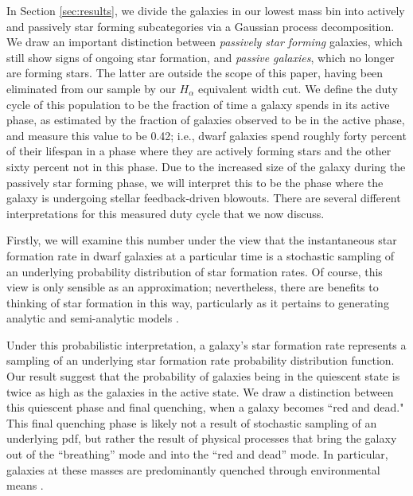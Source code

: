 \documentclass[iop]{emulateapj}
\begin{document}
In Section \ref{sec:results}, we divide the galaxies in our lowest mass bin into actively and passively star forming subcategories via a Gaussian process decomposition. We draw an important distinction between \textit{passively star forming} galaxies, which still show signs of ongoing star formation, and \textit{passive galaxies}, which no longer are forming stars. The latter are outside the scope of this paper, having been eliminated from our sample by our $H_{\alpha}$ equivalent width cut. We define the duty cycle of this population to be the fraction of time a galaxy spends in its active phase, as estimated by the fraction of galaxies observed to be in the active phase, and measure this value to be 0.42; i.e., dwarf galaxies spend roughly forty percent of their lifespan in a phase where they are actively forming stars and the other sixty percent not in this phase. Due to the increased size of the galaxy during the passively star forming phase, we will interpret this to be the phase where the galaxy is undergoing stellar feedback-driven blowouts. There are several different interpretations for this measured duty cycle that we now discuss.

Firstly, we will examine this number under the view that the instantaneous star formation rate in dwarf galaxies at a particular time is a stochastic sampling of an underlying probability distribution of star formation rates. Of course, this view is only sensible as an approximation; nevertheless, there are benefits to thinking of star formation in this way, particularly as it pertains to generating analytic and semi-analytic models \citep{Kelson16}. 

Under this probabilistic interpretation, a galaxy's star formation rate represents a sampling of an underlying star formation rate probability distribution function. Our result suggest that the probability of galaxies being in the quiescent state is twice as high as the galaxies in the active state. We draw a distinction between this quiescent phase and final quenching, when a galaxy becomes ``red and dead." This final quenching phase is likely not a result of stochastic sampling of an underlying pdf, but rather the result of physical processes that bring the galaxy out of the ``breathing'' mode and into the ``red and dead'' mode. In particular, galaxies at these masses are predominantly quenched through environmental means \citep{Kauffmann03, geha12}.
\end{document}
